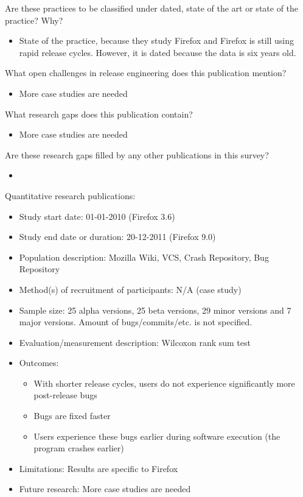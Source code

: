 \documentclass[]{book}
\providecommand{\tightlist}{%
  \setlength{\itemsep}{0pt}\setlength{\parskip}{0pt}}
\begin{document}
Are these practices to be classified under dated, state of the art or
state of the practice? Why?

\begin{itemize}
\tightlist
\item
  State of the practice, because they study Firefox and Firefox is still
  using rapid release cycles. However, it is dated because the data is
  six years old.
\end{itemize}

What open challenges in release engineering does this publication
mention?

\begin{itemize}
\tightlist
\item
  More case studies are needed
\end{itemize}

What research gaps does this publication contain?

\begin{itemize}
\tightlist
\item
  More case studies are needed
\end{itemize}

Are these research gaps filled by any other publications in this survey?

\begin{itemize}
\item
\end{itemize}

Quantitative research publications:

\begin{itemize}
\tightlist
\item
  Study start date: 01-01-2010 (Firefox 3.6)
\item
  Study end date or duration: 20-12-2011 (Firefox 9.0)
\item
  Population description: Mozilla Wiki, VCS, Crash Repository, Bug
  Repository
\item
  Method(s) of recruitment of participants: N/A (case study)
\item
  Sample size: 25 alpha versions, 25 beta versions, 29 minor versions
  and 7 major versions. Amount of bugs/commits/etc. is not specified.
\item
  Evaluation/measurement description: Wilcoxon rank sum test
\item
  Outcomes:

  \begin{itemize}
  \tightlist
  \item
    With shorter release cycles, users do not experience significantly
    more post-release bugs
  \item
    Bugs are fixed faster
  \item
    Users experience these bugs earlier during software execution (the
    program crashes earlier)
  \end{itemize}
\item
  Limitations: Results are specific to Firefox
\item
  Future research: More case studies are needed
\end{itemize}
\end{document}
